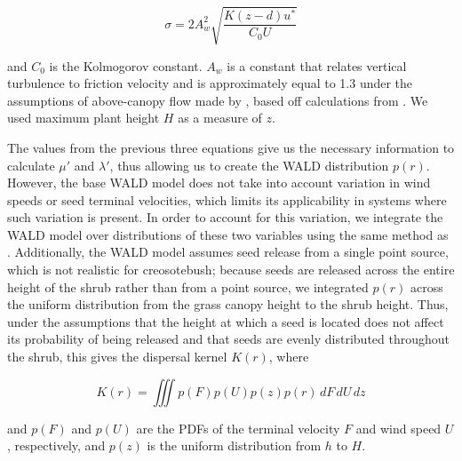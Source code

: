 \documentclass[11pt]{article}\usepackage[]{graphicx}\usepackage[]{color}
\begin{document}
\begin{linenomath*} \begin{equation} \sigma = 2A_{w}^2 \sqrt{\frac{K(z-d)u^*}{C_{0}U}} \end{equation} 
\end{linenomath*} 

and $C_{0}$ is the Kolmogorov constant.
$A_{w}$ is a constant that relates vertical turbulence to friction velocity and is approximately equal to 1.3 under the assumptions of above-canopy flow made by \citet{skarpaas2007dispersal}, based off calculations from \citet{hsieh1997dissipation}.
We used maximum plant height $H$ as a measure of $z$.

The values from the previous three equations give us the necessary information to calculate $\mu'$ and $\lambda'$, thus allowing us to create the WALD distribution $p(r)$.
However, the base WALD model does not take into account variation in wind speeds or seed terminal velocities, which limits its applicability in systems where such variation is present.
In order to account for this variation, we integrate the WALD model over distributions of these two variables using the same method as \citet{skarpaas2007dispersal}.
Additionally, the WALD model assumes seed release from a single point source, which is not realistic for creosotebush; because seeds are released across the entire height of the shrub rather than from a point source, we integrated $p(r)$ across the uniform distribution from the grass canopy height to the shrub height.
Thus, under the assumptions that the height at which a seed is located does not affect its probability of being released and that seeds are evenly distributed throughout the shrub, this gives the dispersal kernel $K(r)$, where

\begin{linenomath*} \begin{equation} K(r) = \iiint p(F)p(U)p(z)p(r) \,dF\,dU\,dz \end{equation} 
\end{linenomath*} 

and $p(F)$ and $p(U)$ are the PDFs of the terminal velocity $F$ and wind speed $U$, respectively, and $p(z)$ is the uniform distribution from $h$ to $H$.
\end{document}
